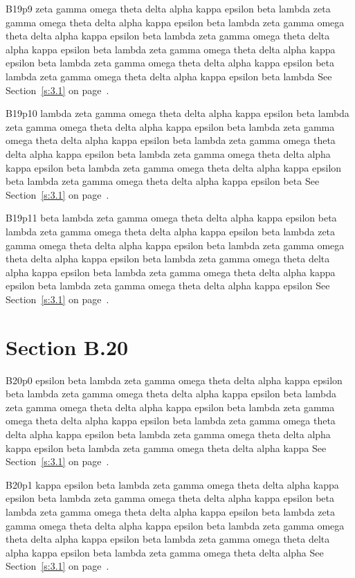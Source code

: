 B19p9 zeta gamma omega theta delta alpha kappa epsilon beta lambda zeta gamma omega theta delta alpha kappa epsilon beta lambda zeta gamma omega theta delta alpha kappa epsilon beta lambda zeta gamma omega theta delta alpha kappa epsilon beta lambda zeta gamma omega theta delta alpha kappa epsilon beta lambda zeta gamma omega theta delta alpha kappa epsilon beta lambda zeta gamma omega theta delta alpha kappa epsilon beta lambda See Section~\ref{s:3.1} on page~\pageref{s:3.1}.

B19p10 lambda zeta gamma omega theta delta alpha kappa epsilon beta lambda zeta gamma omega theta delta alpha kappa epsilon beta lambda zeta gamma omega theta delta alpha kappa epsilon beta lambda zeta gamma omega theta delta alpha kappa epsilon beta lambda zeta gamma omega theta delta alpha kappa epsilon beta lambda zeta gamma omega theta delta alpha kappa epsilon beta lambda zeta gamma omega theta delta alpha kappa epsilon beta See Section~\ref{s:3.1} on page~\pageref{s:3.1}.

B19p11 beta lambda zeta gamma omega theta delta alpha kappa epsilon beta lambda zeta gamma omega theta delta alpha kappa epsilon beta lambda zeta gamma omega theta delta alpha kappa epsilon beta lambda zeta gamma omega theta delta alpha kappa epsilon beta lambda zeta gamma omega theta delta alpha kappa epsilon beta lambda zeta gamma omega theta delta alpha kappa epsilon beta lambda zeta gamma omega theta delta alpha kappa epsilon See Section~\ref{s:3.1} on page~\pageref{s:3.1}.

\section{Section B.20}\label{s:B.20}
B20p0 epsilon beta lambda zeta gamma omega theta delta alpha kappa epsilon beta lambda zeta gamma omega theta delta alpha kappa epsilon beta lambda zeta gamma omega theta delta alpha kappa epsilon beta lambda zeta gamma omega theta delta alpha kappa epsilon beta lambda zeta gamma omega theta delta alpha kappa epsilon beta lambda zeta gamma omega theta delta alpha kappa epsilon beta lambda zeta gamma omega theta delta alpha kappa See Section~\ref{s:3.1} on page~\pageref{s:3.1}.

B20p1 kappa epsilon beta lambda zeta gamma omega theta delta alpha kappa epsilon beta lambda zeta gamma omega theta delta alpha kappa epsilon beta lambda zeta gamma omega theta delta alpha kappa epsilon beta lambda zeta gamma omega theta delta alpha kappa epsilon beta lambda zeta gamma omega theta delta alpha kappa epsilon beta lambda zeta gamma omega theta delta alpha kappa epsilon beta lambda zeta gamma omega theta delta alpha See Section~\ref{s:3.1} on page~\pageref{s:3.1}.

